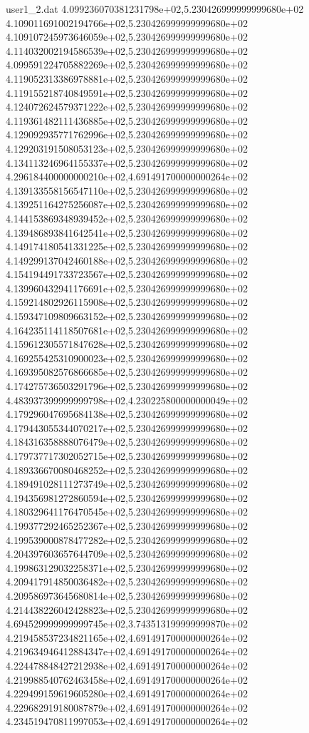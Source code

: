 \begin{filecontents}{user1_2.dat}
4.099236070381231798e+02,5.230426999999999680e+02
4.109011691002194766e+02,5.230426999999999680e+02
4.109107245973646059e+02,5.230426999999999680e+02
4.114032002194586539e+02,5.230426999999999680e+02
4.099591224705882269e+02,5.230426999999999680e+02
4.119052313386978881e+02,5.230426999999999680e+02
4.119155218740849591e+02,5.230426999999999680e+02
4.124072624579371222e+02,5.230426999999999680e+02
4.119361482111436885e+02,5.230426999999999680e+02
4.129092935771762996e+02,5.230426999999999680e+02
4.129203191508053123e+02,5.230426999999999680e+02
4.134113246964155337e+02,5.230426999999999680e+02
4.296184400000000210e+02,4.691491700000000264e+02
4.139133558156547110e+02,5.230426999999999680e+02
4.139251164275256087e+02,5.230426999999999680e+02
4.144153869348939452e+02,5.230426999999999680e+02
4.139486893841642541e+02,5.230426999999999680e+02
4.149174180541331225e+02,5.230426999999999680e+02
4.149299137042460188e+02,5.230426999999999680e+02
4.154194491733723567e+02,5.230426999999999680e+02
4.139960432941176691e+02,5.230426999999999680e+02
4.159214802926115908e+02,5.230426999999999680e+02
4.159347109809663152e+02,5.230426999999999680e+02
4.164235114118507681e+02,5.230426999999999680e+02
4.159612305571847628e+02,5.230426999999999680e+02
4.169255425310900023e+02,5.230426999999999680e+02
4.169395082576866685e+02,5.230426999999999680e+02
4.174275736503291796e+02,5.230426999999999680e+02
4.483937399999999798e+02,4.230225800000000049e+02
4.179296047695684138e+02,5.230426999999999680e+02
4.179443055344070217e+02,5.230426999999999680e+02
4.184316358888076479e+02,5.230426999999999680e+02
4.179737717302052715e+02,5.230426999999999680e+02
4.189336670080468252e+02,5.230426999999999680e+02
4.189491028111273749e+02,5.230426999999999680e+02
4.194356981272860594e+02,5.230426999999999680e+02
4.180329641176470545e+02,5.230426999999999680e+02
4.199377292465252367e+02,5.230426999999999680e+02
4.199539000878477282e+02,5.230426999999999680e+02
4.204397603657644709e+02,5.230426999999999680e+02
4.199863129032258371e+02,5.230426999999999680e+02
4.209417914850036482e+02,5.230426999999999680e+02
4.209586973645680814e+02,5.230426999999999680e+02
4.214438226042428823e+02,5.230426999999999680e+02
4.694529999999999745e+02,3.743513199999999870e+02
4.219458537234821165e+02,4.691491700000000264e+02
4.219634946412884347e+02,4.691491700000000264e+02
4.224478848427212938e+02,4.691491700000000264e+02
4.219988540762463458e+02,4.691491700000000264e+02
4.229499159619605280e+02,4.691491700000000264e+02
4.229682919180087879e+02,4.691491700000000264e+02
4.234519470811997053e+02,4.691491700000000264e+02

\end{filecontents}

